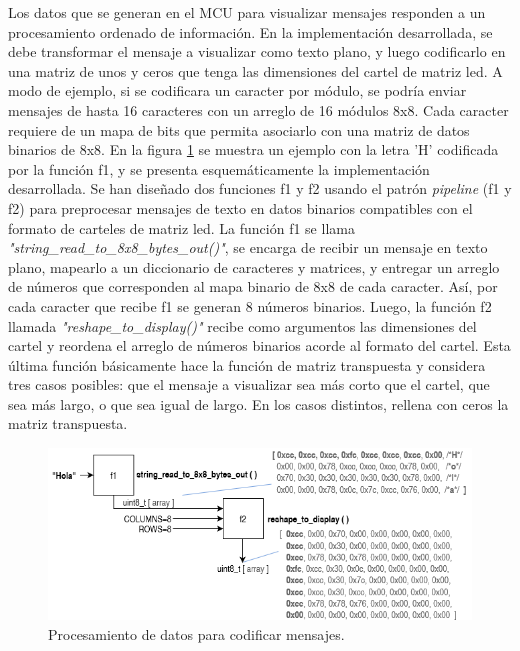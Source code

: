  
Los datos que se generan en el MCU para visualizar mensajes responden a un procesamiento ordenado de información. En la implementación desarrollada, se debe transformar el mensaje a visualizar como texto plano, y luego codificarlo en una matriz de unos y ceros que tenga las dimensiones del cartel de matriz led. A modo de ejemplo, si se codificara un caracter por módulo, se podría enviar mensajes de hasta 16 caracteres con un arreglo de 16 módulos 8x8. Cada caracter requiere de un mapa de bits que permita asociarlo con una matriz de datos binarios de 8x8. En la figura \ref{fig:dataPipeline} se muestra un ejemplo con la letra 'H' codificada por la función f1, y se presenta esquemáticamente la implementación desarrollada. Se han diseñado dos funciones f1 y f2 usando el patrón \textit{pipeline} (f1 y f2) para preprocesar mensajes de texto en datos binarios compatibles con el formato de carteles de matriz led. La función f1 se llama \textit{"string\_read\_to\_8x8\_bytes\_out()"}, se encarga de recibir un mensaje en texto plano, mapearlo a un diccionario de caracteres y matrices, y entregar un arreglo de números que corresponden al mapa binario de 8x8 de cada caracter. Así, por cada caracter que recibe f1 se generan 8 números binarios. Luego, la función f2 llamada \textit{"reshape\_to\_display()"} recibe como argumentos las dimensiones del cartel y reordena el arreglo de números binarios acorde al formato del cartel. Esta última función básicamente hace la función de matriz transpuesta y considera tres casos posibles: que el mensaje a visualizar sea más corto que el cartel, que sea más largo, o que sea igual de largo. En los casos distintos, rellena con ceros la matriz transpuesta.\\

\begin{figure}[htbp]
	\centering
	\includegraphics[width=1\textwidth]{./Figures/dataPipeline.png}
	\caption{Procesamiento de datos para codificar mensajes.}
	\label{fig:dataPipeline}
\end{figure}

